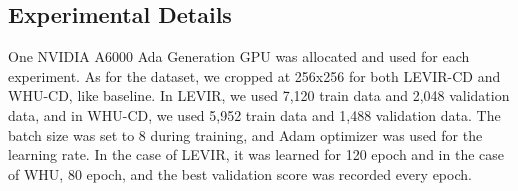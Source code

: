 \documentclass[../main.tex]{subfiles}
\begin{document}
\subsection{Experimental Details}
One NVIDIA A6000 Ada Generation GPU was allocated and used for each experiment. As for the dataset, we cropped at 256x256 for both LEVIR-CD and WHU-CD, like baseline. In LEVIR, we used 7,120 train data and 2,048 validation data, and in WHU-CD, we used 5,952 train data and 1,488 validation data. The batch size was set to 8 during training, and Adam optimizer was used for the learning rate. In the case of LEVIR, it was learned for 120 epoch and in the case of WHU, 80 epoch, and the best validation score was recorded every epoch. 
\end{document}
